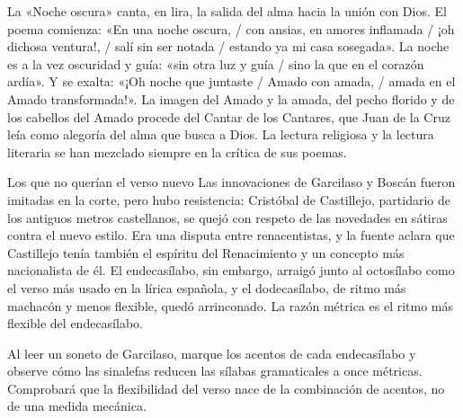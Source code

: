\documentclass{book}
\begin{document}
La «Noche oscura» canta, en lira, la salida del alma hacia la unión con Dios. El poema comienza: «En una noche oscura, / con ansias, en amores inflamada / ¡oh dichosa ventura!, / salí sin ser notada / estando ya mi casa sosegada». La noche es a la vez oscuridad y guía: «sin otra luz y guía / sino la que en el corazón ardía». Y se exalta: «¡Oh noche que juntaste / Amado con amada, / amada en el Amado transformada!». La imagen del Amado y la amada, del pecho florido y de los cabellos del Amado procede del Cantar de los Cantares, que Juan de la Cruz leía como alegoría del alma que busca a Dios. La lectura religiosa y la lectura literaria se han mezclado siempre en la crítica de sus poemas.


\begin{tcolorbox}[title={Consejo}, studiumtip, breakable]

Los que no querían el verso nuevo
Las innovaciones de Garcilaso y Boscán fueron imitadas en la corte, pero hubo resistencia: Cristóbal de Castillejo, partidario de los antiguos metros castellanos, se quejó con respeto de las novedades en sátiras contra el nuevo estilo. Era una disputa entre renacentistas, y la fuente aclara que Castillejo tenía también el espíritu del Renacimiento y un concepto más nacionalista de él. El endecasílabo, sin embargo, arraigó junto al octosílabo como el verso más usado en la lírica española, y el dodecasílabo, de ritmo más machacón y menos flexible, quedó arrinconado. La razón métrica es el ritmo más flexible del endecasílabo.


Al leer un soneto de Garcilaso, marque los acentos de cada endecasílabo y observe cómo las sinalefas reducen las sílabas gramaticales a once métricas. Comprobará que la flexibilidad del verso nace de la combinación de acentos, no de una medida mecánica.

\end{tcolorbox}
\end{document}
